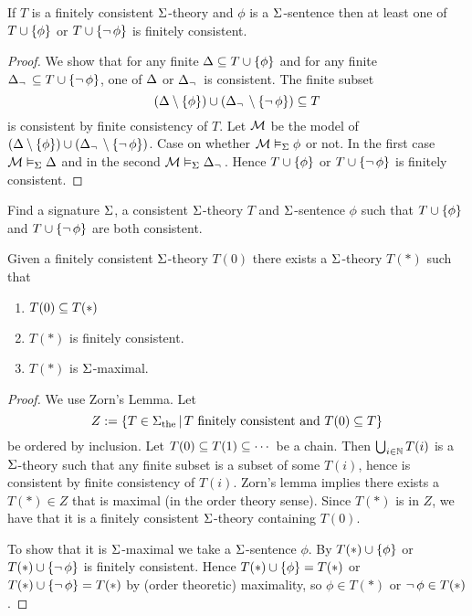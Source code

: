 \begin{lem}
    If $T$ is a finitely consistent $\Sigma$-theory 
    and $\phi$ is a $\Sigma$-sentence then at least one of
    $T \cup \left\{\phi\right\}$ or $T \cup \left\{\neg\, \phi\right\}$ is finitely consistent.
\end{lem}
\begin{proof}
    We show that for any finite $\Delta \subseteq T \cup \left\{\phi\right\}$ and 
    for any finite $\Delta_\neg\, \subseteq T \cup \left\{\neg\, \phi\right\}$,
    one of $\Delta$ or $\Delta_\neg\,$ is consistent. 
    The finite subset
    \[(\Delta \setminus \left\{\phi\right\}) \cup 
    (\Delta_\neg\, \setminus \left\{\neg\, \phi\right\}) \subseteq T\]
    is consistent by finite consistency of $T$.
    Let $\mathcal{M}$ be the model of 
    $(\Delta \setminus \left\{\phi\right\}) \cup 
    (\Delta_\neg\, \setminus \left\{\neg\, \phi\right\})$.
    Case on whether $\mathcal{M} \vDash_{\Sigma} \phi$ or not.
    In the first case $\mathcal{M} \vDash_{\Sigma} \Delta$
    and in the second $\mathcal{M} \vDash_{\Sigma} \Delta_\neg\,$.
    Hence $T \cup \left\{\phi\right\}$ or $T \cup \left\{\neg\, \phi\right\}$ 
    is finitely consistent.
\end{proof}

\begin{ex}
    Find a signature $\Sigma$, a consistent $\Sigma$-theory $T$
    and $\Sigma$-sentence $\phi$ such that  
    $T \cup \left\{\phi\right\}$ and 
    $T \cup \left\{\neg\, \phi\right\}$ are both consistent.
\end{ex}
    
\begin{prop}
    Given a finitely consistent $\Sigma$-theory $T(0)$
    there exists a $\Sigma$-theory $T(*)$ such that 
    \begin{enumerate}
        \item $T(0) \subseteq T(*)$
        \item $T(*)$ is finitely consistent.
        \item $T(*)$ is $\Sigma$-maximal.
    \end{enumerate}
\end{prop}
\begin{proof}
    We use Zorn's Lemma.
    Let 
    \[Z := \left\{T \in {\Sigma}_\mathrm{the} \,|\, T 
    \text{ finitely consistent and } T(0) \subseteq T\right\}\]
    be ordered by inclusion.
    Let $T(0) \subseteq T(1) \subseteq \cdots $ be a chain.
    Then $\bigcup_{i \in \mathbb{N}} T(i)$ is a $\Sigma$-theory
    such that any finite subset is a subset of some $T(i)$,
    hence is consistent by finite consistency of $T(i)$.
    Zorn's lemma implies there exists a $T(*) \in Z$
    that is maximal (in the order theory sense).
    Since $T(*)$ is in $Z$, 
    we have that it is a finitely consistent $\Sigma$-theory containing $T(0)$.
    
    To show that it is $\Sigma$-maximal we take a $\Sigma$-sentence $\phi$.
    By  
    $T(*) \cup \left\{\phi\right\}$ or 
    $T(*) \cup \left\{\neg\, \phi\right\}$ is finitely consistent.
    Hence 
    $T(*) \cup \left\{\phi\right\} = T(*)$ or 
    $T(*) \cup \left\{\neg\, \phi\right\} = T(*)$ by (order theoretic) maximality,
    so $\phi \in T(*)$ or $\neg\, \phi \in T(*)$.
\end{proof}

